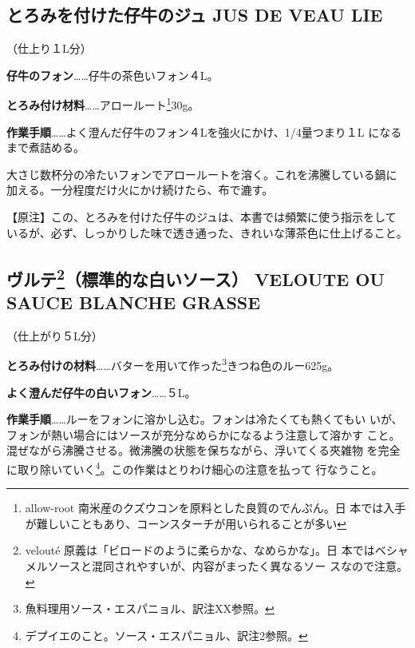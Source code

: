 \documentclass[twoside,12Q,b5paper]{escoffierltjsbook}
\begin{document}
\subsection{とろみを付けた仔牛のジュ JUS DE VEAU
LIE}\label{ux3068ux308dux307fux3092ux4ed8ux3051ux305fux4ed4ux725bux306eux30b8ux30e5-jus-de-veau-lie}

（仕上り１L分）

\textbf{仔牛のフォン}\ldots{}\ldots{}仔牛の茶色いフォン４L。

\textbf{とろみ付け材料}\ldots{}\ldots{}アロールート\footnote{allow-root
  南米産のクズウコンを原料とした良質のでんぷん。日
  本では入手が難しいこともあり、コーンスターチが用いられることが多い}30g。

\textbf{作業手順}\ldots{}\ldots{}よく澄んだ仔牛のフォン４Lを強火にかけ、1/4量つまり１L
になるまで煮詰める。

大さじ数杯分の冷たいフォンでアロールートを溶く。これを沸騰している鍋に
加える。一分程度だけ火にかけ続けたら、布で漉す。

【原注】この、とろみを付けた仔牛のジュは、本書では頻繁に使う指示をして
いるが、必ず、しっかりした味で透き通った、きれいな薄茶色に仕上げること。

\subsection[ヴルテ（標準的な白いソース） VELOUTE OU SAUCE BLANCHE
GRASSE]{\texorpdfstring{ヴルテ\footnote{velouté
  原義は「ビロードのように柔らかな、なめらかな」。日
  本ではベシャメルソースと混同されやすいが、内容がまったく異なるソー
  スなので注意。}（標準的な白いソース） VELOUTE OU SAUCE BLANCHE
GRASSE}{ヴルテ（標準的な白いソース） VELOUTE OU SAUCE BLANCHE GRASSE}}\label{ux30f4ux30ebux30c6102013ux6a19ux6e96ux7684ux306aux767dux3044ux30bdux30fcux30b9-veloute-ou-sauce-blanche-grasse}

（仕上がり５L分）

\textbf{とろみ付けの材料}\ldots{}\ldots{}バターを用いて作った\footnote{魚料理用ソース・エスパニョル、訳注XX参照。}きつね色のルー625g。

\textbf{よく澄んだ仔牛の白いフォン}\ldots{}\ldots{}５L。

\textbf{作業手順}\ldots{}\ldots{}ルーをフォンに溶かし込む。フォンは冷たくても熱くてもい
いが、フォンが熱い場合にはソースが充分なめらかになるよう注意して溶かす
こと。混ぜながら沸騰させる。微沸騰の状態を保ちながら、浮いてくる夾雑物
を完全に取り除いていく\footnote{デプイエのこと。ソース・エスパニョル、訳注2参照。}。この作業はとりわけ細心の注意を払って
行なうこと。
\end{document}
